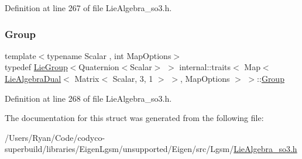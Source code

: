 Definition at line 267 of file Lie\+Algebra\+\_\+so3.\+h.

\hypertarget{structinternal_1_1traits_3_01_map_3_01_lie_algebra_dual_3_01_matrix_3_01_scalar_00_013_00_011_01e8a24fa295b52ac8e6af43d3afd0f30d_a9922d6f6d1e181a21318ebee9de891d2}{}\label{structinternal_1_1traits_3_01_map_3_01_lie_algebra_dual_3_01_matrix_3_01_scalar_00_013_00_011_01e8a24fa295b52ac8e6af43d3afd0f30d_a9922d6f6d1e181a21318ebee9de891d2} 
\subsubsection{\texorpdfstring{Group}{Group}}
{\footnotesize\ttfamily template$<$typename Scalar , int Map\+Options$>$ \\
typedef \hyperlink{class_lie_group}{Lie\+Group}$<$Quaternion$<$Scalar$>$ $>$ internal\+::traits$<$ Map$<$ \hyperlink{class_lie_algebra_dual}{Lie\+Algebra\+Dual}$<$ Matrix$<$ Scalar, 3, 1 $>$ $>$, Map\+Options $>$ $>$\+::\hyperlink{structinternal_1_1traits_3_01_map_3_01_lie_algebra_dual_3_01_matrix_3_01_scalar_00_013_00_011_01e8a24fa295b52ac8e6af43d3afd0f30d_a9922d6f6d1e181a21318ebee9de891d2}{Group}}



Definition at line 268 of file Lie\+Algebra\+\_\+so3.\+h.



The documentation for this struct was generated from the following file\+:\begin{DoxyCompactItemize}
\item 
/\+Users/\+Ryan/\+Code/codyco-\/superbuild/libraries/\+Eigen\+Lgsm/unsupported/\+Eigen/src/\+Lgsm/\hyperlink{_lie_algebra__so3_8h}{Lie\+Algebra\+\_\+so3.\+h}\end{DoxyCompactItemize}
